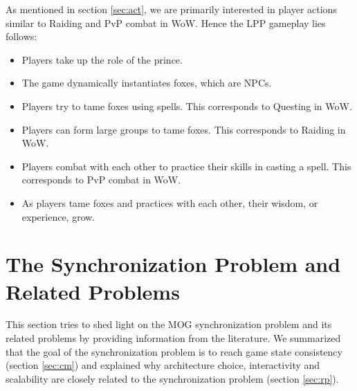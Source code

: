 \documentclass{article}
\begin{document}
As mentioned in section \ref{sec:act}, we are primarily interested in player actions similar to Raiding and PvP combat in WoW. Hence the LPP gameplay lies follows:
\begin{itemize}
\item Players take up the role of the prince.
\item The game dynamically instantiates foxes, which are NPCs.
\item Players try to tame foxes using spells. This corresponds to Questing in WoW.
\item Players can form large groups to tame foxes. This corresponds to Raiding in WoW.
\item Players combat with each other to practice their skills in casting a spell. This corresponds to PvP combat in WoW.
\item As players tame foxes and practices with each other, their wisdom, or experience, grow.
\end{itemize}


\section{The Synchronization Problem and Related Problems}
\label{dfsync}
This section tries to shed light on the MOG synchronization problem and its related problems by providing information from the literature. We summarized that the goal of the synchronization problem is to reach game state consistency (section \ref{sec:cm}) and explained why architecture choice, interactivity and scalability are closely related to the synchronization problem (section \ref{sec:rp}).
\end{document}
